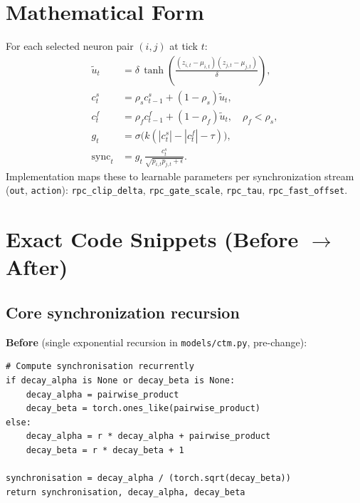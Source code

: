 \documentclass[11pt]{article}
\begin{document}
\section{Mathematical Form}
For each selected neuron pair $(i,j)$ at tick $t$:
\begin{align}
\tilde{u}_t &= \delta\,\tanh\left(\frac{(z_{i,t}-\mu_{i,t})(z_{j,t}-\mu_{j,t})}{\delta}\right), \\
 c_t^s &= \rho_s c_{t-1}^s + (1-\rho_s)\tilde{u}_t, \\
 c_t^f &= \rho_f c_{t-1}^f + (1-\rho_f)\tilde{u}_t, \quad \rho_f < \rho_s, \\
 g_t &= \sigma\big(k(|c_t^s|-|c_t^f|-\tau)\big), \\
 \mathrm{sync}_t &= g_t\,\frac{c_t^s}{\sqrt{p_{i,t}p_{j,t}+\epsilon}}.
\end{align}
Implementation maps these to learnable parameters per synchronization stream (\texttt{out}, \texttt{action}):
\texttt{rpc\_clip\_delta}, \texttt{rpc\_gate\_scale}, \texttt{rpc\_tau}, \texttt{rpc\_fast\_offset}.

\section{Exact Code Snippets (Before $\rightarrow$ After)}

\subsection{Core synchronization recursion}
\textbf{Before} (single exponential recursion in \texttt{models/ctm.py}, pre-change):
\begin{lstlisting}[style=pycode]
# Compute synchronisation recurrently
if decay_alpha is None or decay_beta is None:
    decay_alpha = pairwise_product
    decay_beta = torch.ones_like(pairwise_product)
else:
    decay_alpha = r * decay_alpha + pairwise_product
    decay_beta = r * decay_beta + 1

synchronisation = decay_alpha / (torch.sqrt(decay_beta))
return synchronisation, decay_alpha, decay_beta
\end{lstlisting}
\end{document}
